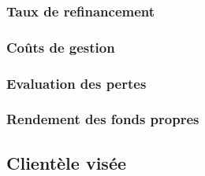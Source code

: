 \documentclass[10pt,a4paper]{article}
\begin{document}
\subsubsection{Taux de refinancement}

\subsubsection{Coûts de gestion}
\subsubsection{Evaluation des pertes}

\subsubsection{Rendement des fonds propres}

\subsection{Clientèle visée}
\end{document}
